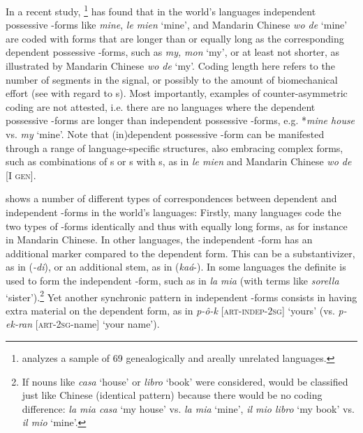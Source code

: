 \documentclass[output=paper]{langsci/langscibook}
\begin{document}
In a recent study, \citet{Ye2017}{\-}\footnote{\citet{Ye2017} analyzes a sample of 69 genealogically and areally unrelated languages.} has found that in the world's languages independent possessive -forms like  \textit{mine},  \textit{le mien} ‘mine’, and Mandarin  Chinese \textit{wo de} ‘mine’ are coded with forms that are longer than or equally long as the corresponding dependent possessive -forms, such as  \textit{my,}  \textit{mon} ‘my’, or at least not shorter, as illustrated by Mandarin  Chinese \textit{wo de} ‘my’. Coding length here refers to the number of segments in the signal, or possibly to the amount of biomechanical effort (see \citealt{NapoliEtAl2014} with regard to s). Most importantly, examples of counter-asymmetric coding are not attested, i.e. there are no languages where the dependent possessive -forms are longer than independent possessive -forms, e.g. *\textit{mine house} vs. \textit{my} ‘mine’. Note that (in)dependent possessive -form can be manifested through a range of language-specific structures, also embracing complex forms, such as combinations of s or s with s, as in  \textit{le mien} and Mandarin  Chinese \textit{wo de} [I \textsc{gen}]. 

\largerpage
{} shows a number of different types of correspondences between dependent and independent -forms in the world's languages: Firstly, many languages code the two types of -forms identically and thus with equally long forms, as for instance in Mandarin  Chinese. In other languages, the independent -form has an additional marker compared to the dependent form. This can be a substantivizer, as in  (\textit{{}-di}), or an additional stem, as in  (\textit{kaá}{}-). In some languages the definite  is used to form the independent -form, such as in  \textit{la mia} (with  terms like \textit{sorella} ‘sister’).\footnote{If nouns like \textit{casa} ‘house’ or \textit{libro} ‘book’ were considered,  would be classified just like Chinese  (identical pattern) because there would be no coding difference: \textit{la mia casa} ‘my house’ vs. \textit{la mia} ‘mine’, \textit{il mio libro} ‘my book’ vs. \textit{il mio} ‘mine’.} Yet another synchronic pattern in independent -forms consists in having extra material on the dependent form, as in  \textit{p-ô-k} [\textsc{art-indep-2sg}] ‘yours’ (vs. \textit{p-ek-ran} [\textsc{art-2sg}{}-name] ‘your name’).
\end{document}

